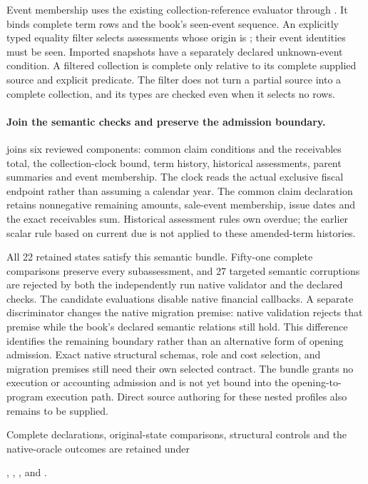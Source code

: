 Event membership uses the existing collection-reference evaluator through
. It binds complete term rows and the book's
seen-event sequence. An explicitly typed equality filter selects assessments
whose origin is ; their event identities must be seen.
Imported snapshots have a separately declared unknown-event condition. A
filtered collection is complete only relative to its complete supplied source
and explicit predicate. The filter does not turn a partial source into a
complete collection, and its types are checked even when it selects no rows.

\paragraph{Join the semantic checks and preserve the admission boundary.}
 joins six reviewed components: common claim
conditions and the receivables total, the collection-clock bound, term history,
historical assessments, parent summaries and event membership. The clock reads
the actual exclusive fiscal endpoint rather than assuming a calendar year.
The common claim declaration retains nonnegative remaining amounts, sale-event
membership, issue dates and the exact receivables sum. Historical assessment
rules own overdue; the earlier scalar rule based on current due is not applied
to these amended-term histories.

All 22 retained states satisfy this semantic bundle. Fifty-one complete
comparisons preserve every subassessment, and 27 targeted semantic corruptions
are rejected by both the independently run native validator and the declared
checks. The candidate evaluations disable native financial callbacks. A
separate discriminator changes the native migration premise: native validation
rejects that premise while the book's declared semantic relations still hold.
This difference identifies the remaining boundary rather than an alternative
form of opening admission. Exact native structural schemas, role and cost
selection, and migration premises still need their own selected contract.
The bundle grants no execution or accounting admission and is not yet bound
into the opening-to-program execution path. Direct source authoring for these
nested profiles also remains to be supplied.

Complete declarations, original-state comparisons, structural controls and
the native-oracle outcomes are retained under
\begingroup\raggedright
{},
,
,
and .
\par\endgroup
